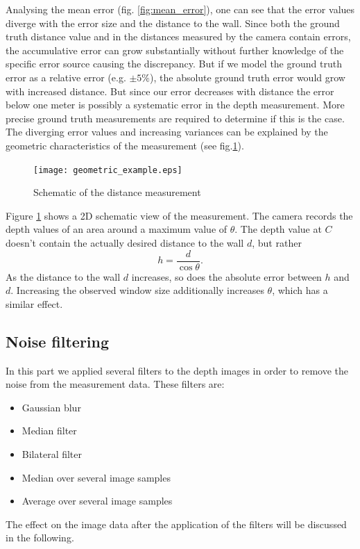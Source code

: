 \documentclass[DIV12,a4paper]{scrartcl}
\begin{document}
Analysing the mean error (fig. \ref{fig:mean_error}), one can see that the error values diverge with the error size and the distance to the wall. Since both the ground truth distance value and in the distances measured by the camera contain errors, the accumulative error can grow substantially without further knowledge of the specific error source causing the discrepancy. But if we model the ground truth error as a relative error (e.g. $\pm5\%$), the absolute ground truth error would grow with increased distance. But since our error decreases with distance the error below one meter is possibly a systematic error in the depth measurement. 
More precise ground truth measurements are required to determine if this is the case.
 The diverging error values and increasing variances can be explained by the geometric characteristics of the measurement (see fig.\ref{fig:geometric_representation}).
\begin{figure}[!ht]
  \centering
  \texttt{[image: geometric\_example.eps]}
  \caption{Schematic of the distance measurement}
  \label{fig:geometric_representation}
\end{figure}\par
Figure \ref{fig:geometric_representation} shows a 2D schematic view of the measurement. The camera records the depth values of an area around a maximum value of $\theta$. The depth value at $C$ doesn't contain the actually desired distance to the wall $d$, but rather\[ h=\frac{d}{\cos\theta}.\]
As the distance to the wall $d$ increases, so does the absolute error between $h$ and $d$. Increasing the observed window size additionally increases $\theta$, which has a similar effect.

\newpage
\subsection{Noise filtering}
\label{sec:filtering}
In this part we applied several filters to the depth images in order to remove the noise from the measurement data. These filters are:
\begin{itemize}
\item Gaussian blur
\item Median filter
\item Bilateral filter
\item Median over several image samples
\item Average over several image samples
\end{itemize}
The effect on the image data after the application of the filters will be discussed in the following.
\end{document}
